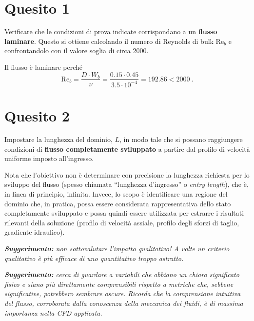 \section{Quesito 1}

Verificare che le condizioni di prova indicate corrispondano a un \textbf{flusso laminare}. Questo si ottiene calcolando il numero di Reynolds di bulk $\text{Re}_b$ e confrontandolo con il valore soglia di circa 2000.

\NotionDivider

Il flusso è laminare perché 
\begin{equation}
\label{eq:Re-b-1}
\text{Re}_b = \frac{D\cdot W_b}{\nu}=\frac{0.15 \cdot 0.45}{3.5 \cdot 10^{-4}}=192.86<2000\ .
\end{equation}

\newpage

\section{Quesito 2}
    
Impostare la lunghezza del dominio, $L$, in modo tale che si possano raggiungere condizioni di \textbf{flusso completamente sviluppato} a partire dal profilo di velocità uniforme imposto all'ingresso. 
    
Nota che l'obiettivo non è determinare con precisione la lunghezza richiesta per lo sviluppo del flusso (spesso chiamata ``lunghezza d'ingresso'' o \emph{entry length}), che è, in linea di principio, infinita. Invece, lo scopo è identificare una regione del dominio che, in pratica, possa essere considerata rappresentativa dello stato completamente sviluppato e possa quindi essere utilizzata per estrarre i risultati rilevanti della soluzione (profilo di velocità assiale, profilo degli sforzi di taglio, gradiente idraulico).

\vspace{0.3em}
    
\emph{\textbf{Suggerimento:} non sottovalutare l'impatto qualitativo! A volte un criterio qualitativo è più efficace di uno quantitativo troppo astratto.}

\vspace{0.3em}

\emph{\textbf{Suggerimento:} cerca di guardare a variabili che abbiano un chiaro significato fisico e siano più direttamente comprensibili rispetto a metriche che, sebbene significative, potrebbero sembrare oscure. Ricorda che la comprensione intuitiva del flusso, corroborata dalla conoscenza della meccanica dei fluidi, è di massima importanza nella CFD applicata.}

